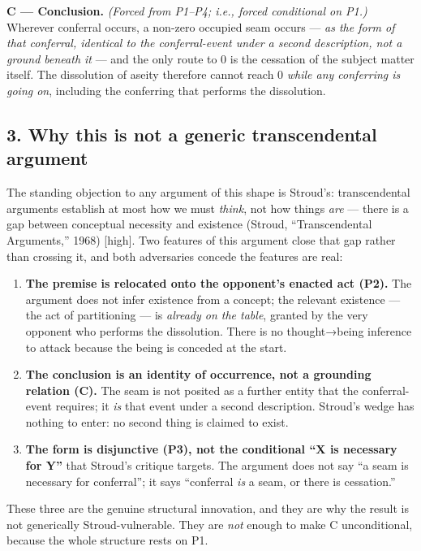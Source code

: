 \documentclass[11pt]{article}
\begin{document}
\textbf{C — Conclusion.} \emph{(Forced from P1–P4; i.e., forced conditional on P1.)} Wherever conferral occurs, a non-zero occupied seam occurs — \emph{as the form of that conferral, identical to the conferral-event under a second description, not a ground beneath it} — and the only route to 0 is the cessation of the subject matter itself. The dissolution of aseity therefore cannot reach 0 \emph{while any conferring is going on}, including the conferring that performs the dissolution.

\subsection*{3. Why this is not a generic transcendental argument}

The standing objection to any argument of this shape is Stroud's: transcendental arguments establish at most how we must \emph{think}, not how things \emph{are} — there is a gap between conceptual necessity and existence (Stroud, ``Transcendental Arguments,'' 1968) [high]. Two features of this argument close that gap rather than crossing it, and both adversaries concede the features are real:

\begin{enumerate}
\item \textbf{The premise is relocated onto the opponent's enacted act (P2).} The argument does not infer existence from a concept; the relevant existence — the act of partitioning — is \emph{already on the table}, granted by the very opponent who performs the dissolution. There is no thought→being inference to attack because the being is conceded at the start.
\item \textbf{The conclusion is an identity of occurrence, not a grounding relation (C).} The seam is not posited as a further entity that the conferral-event requires; it \emph{is} that event under a second description. Stroud's wedge has nothing to enter: no second thing is claimed to exist.
\item \textbf{The form is disjunctive (P3), not the conditional ``X is necessary for Y''} that Stroud's critique targets. The argument does not say ``a seam is necessary for conferral''; it says ``conferral \emph{is} a seam, or there is cessation.''
\end{enumerate}

These three are the genuine structural innovation, and they are why the result is not generically Stroud-vulnerable. They are \emph{not} enough to make C unconditional, because the whole structure rests on P1.
\end{document}
